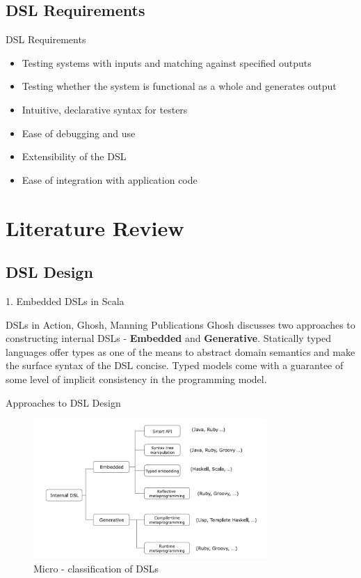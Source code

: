 \documentclass{beamer}
\begin{document}
\subsection{DSL Requirements}
\begin{frame}{DSL Requirements}
  \begin{itemize}
    \item Testing systems with inputs and matching against specified outputs
    \item Testing whether the system is functional as a whole and generates output
    \item Intuitive, declarative syntax for testers
    \item Ease of debugging and use
    \item Extensibility of the DSL
    \item Ease of integration with application code
  \end{itemize}
\end{frame}

\section{Literature Review}

\subsection{DSL Design}

\begin{frame}{1. Embedded DSLs in Scala}
\begin{block}{DSLs in Action, Ghosh, Manning Publications}
Ghosh discusses two approaches to constructing internal DSLs - \textbf{Embedded} and \textbf{Generative}. Statically typed languages offer types as one of the means to abstract domain semantics and make the surface syntax of the DSL concise. Typed models come with a
guarantee of some level of implicit consistency in the programming model. 
\end{block}
\end{frame}

\begin{frame}{Approaches to DSL Design}
\begin{figure}[h!]
  \centering
    \includegraphics[height=200px]{figures/classification.png}
  \caption{Micro - classification of DSLs}
\end{figure}
\end{frame}
\end{document}
